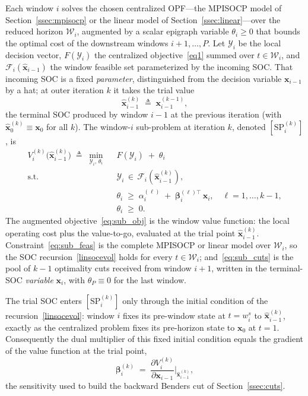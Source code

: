 Each window $i$ solves the chosen centralized OPF---the MPISOCP model of
Section~\ref{ssec:mpisocp} or the linear model of
Section~\ref{ssec:linear}---over the reduced horizon $\mathcal{W}_i$,
augmented by a scalar epigraph variable $\theta_i\ge0$ that bounds the
optimal cost of the downstream windows $i{+}1,\dots,P$. Let
$\mathcal{Y}_i$ be the local decision vector, $F(\mathcal{Y}_i)$ the
centralized objective~\eqref{eq1} summed over $t\in\mathcal{W}_i$, and
$\mathcal{F}_i(\hat{\bm{x}}_{i-1})$ the window feasible set parameterized
by the incoming SOC. That incoming SOC is a fixed \emph{parameter},
distinguished from the decision variable $\bm{x}_{i-1}$ by a hat; at
outer iteration $k$ it takes the trial value
\begin{equation}
\label{eq:trial}
\hat{\bm{x}}_{i-1}^{(k)} \;\triangleq\; \bm{x}_{i-1}^{(k-1)},
\end{equation}
the terminal SOC produced by window $i{-}1$ at the previous iteration
(with $\hat{\bm{x}}_0^{(k)}\equiv\bm{x}_0$ for all $k$). The window-$i$
sub-problem at iteration $k$, denoted $[\mathrm{SP}_i^{(k)}]$, is
\begin{subequations}
\label{eq:subproblem}
\begin{align}
V_i^{(k)}\big(\hat{\bm{x}}_{i-1}^{(k)}\big) \;\triangleq\;
\min_{\mathcal{Y}_i,\,\theta_i}\;\;
& F(\mathcal{Y}_i)\;+\;\theta_i
\label{eq:sub_obj}\\[2pt]
\text{s.t.}\quad
& \mathcal{Y}_i \,\in\, \mathcal{F}_i(\hat{\bm{x}}_{i-1}^{(k)}),
\label{eq:sub_feas}\\[2pt]
& \theta_i \;\ge\; \alpha_i^{(\ell)} \;+\; \bm{\beta}_i^{(\ell)\top}\, \bm{x}_i,
   \quad \ell = 1,\dots,k{-}1,
\label{eq:sub_cuts}\\[2pt]
& \theta_i \;\ge\; 0 .
\label{eq:sub_thpos}
\end{align}
\end{subequations}
The augmented objective~\eqref{eq:sub_obj} is the window value function:
the local operating cost plus the value-to-go, evaluated at the trial
point $\hat{\bm{x}}_{i-1}^{(k)}$. Constraint~\eqref{eq:sub_feas} is the
complete MPISOCP or linear model over $\mathcal{W}_i$, so the SOC
recursion~\eqref{linsocevol} holds for every $t\in\mathcal{W}_i$;
and~\eqref{eq:sub_cuts} is the pool of $k{-}1$ optimality cuts received
from window $i{+}1$, written in the terminal-SOC \emph{variable}
$\bm{x}_i$, with $\theta_P\equiv0$ for the last window.

The trial SOC enters $[\mathrm{SP}_i^{(k)}]$ only through the initial
condition of the recursion~\eqref{linsocevol}: window $i$ fixes its
pre-window state at $t=w^{s}_i$ to $\hat{\bm{x}}_{i-1}^{(k)}$, exactly as
the centralized problem fixes its pre-horizon state to $\bm{x}_0$ at
$t=1$. Consequently the dual multiplier of this fixed initial condition
equals the gradient of the value function at the trial point,
\begin{equation}
\label{eq:dual_sens}
\bm{\beta}_i^{(k)} \;=\;
\frac{\partial V_i^{(k)}}{\partial \bm{x}_{i-1}}\bigg|_{\hat{\bm{x}}_{i-1}^{(k)}} ,
\end{equation}
the sensitivity used to build the backward Benders cut of
Section~\ref{ssec:cuts}.

